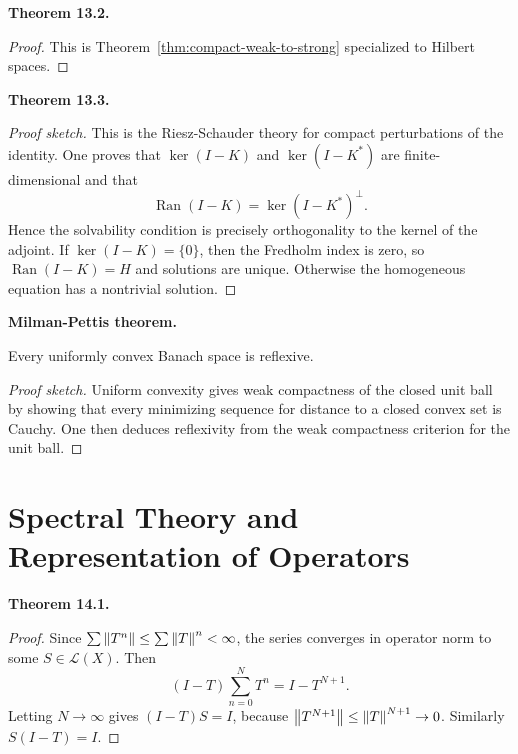 \documentclass[11pt]{article}
\newenvironment{theoremstmt}[1]{%
  \par\medskip\noindent\textbf{Theorem #1. }\itshape
}{\par\medskip}
\newenvironment{namedstmt}[1]{%
  \par\medskip\noindent\textbf{#1. }\itshape
}{\par\medskip}
\begin{document}
\begin{theoremstmt}{13.2}
\thmCompactWeakToStrongHilbert
\end{theoremstmt}

\begin{proof}
This is Theorem~\ref{thm:compact-weak-to-strong} specialized to Hilbert spaces.
\end{proof}

\begin{theoremstmt}{13.3}
\thmFredholmAlternative
\end{theoremstmt}

\begin{proof}[Proof sketch]
This is the Riesz-Schauder theory for compact perturbations of the identity. One proves that $\ker(I-K)$ and $\ker(I-K^*)$ are finite-dimensional and that
\[
\operatorname{Ran}(I-K)=\ker(I-K^*)^{\perp}.
\]
Hence the solvability condition is precisely orthogonality to the kernel of the adjoint. If $\ker(I-K)=\{0\}$, then the Fredholm index is zero, so $\operatorname{Ran}(I-K)=H$ and solutions are unique. Otherwise the homogeneous equation has a nontrivial solution.
\end{proof}

\begin{namedstmt}{Milman-Pettis theorem}
Every uniformly convex Banach space is reflexive.
\end{namedstmt}

\begin{proof}[Proof sketch]
Uniform convexity gives weak compactness of the closed unit ball by showing that every minimizing sequence for distance to a closed convex set is Cauchy. One then deduces reflexivity from the weak compactness criterion for the unit ball.
\end{proof}

\section{Spectral Theory and Representation of Operators}

\begin{theoremstmt}{14.1}
\thmNeumannSeries
\end{theoremstmt}

\begin{proof}
Since $\sum \left\lVert T^n\right\rVert\le \sum \left\lVert T\right\rVert^n<\infty$, the series converges in operator norm to some $S\in\mathcal L(X)$. Then
\[
(I-T)\sum_{n=0}^N T^n=I-T^{N+1}.
\]
Letting $N\to\infty$ gives $(I-T)S=I$, because $\left\lVert T^{N+1}\right\rVert\le \left\lVert T\right\rVert^{N+1}\to 0$. Similarly $S(I-T)=I$.
\end{proof}
\end{document}
